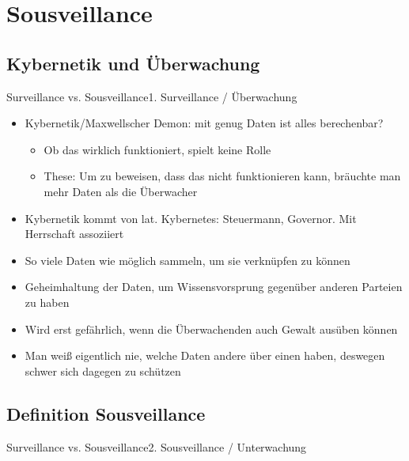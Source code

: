 \documentclass[10pt]{beamer}
\begin{document}
{%
\section{Sousveillance}
\subsection{Kybernetik und Überwachung}
\begin{frame}{Surveillance vs. Sousveillance}{1. Surveillance / Überwachung}

\begin{itemize}
  \item<1-> Kybernetik/Maxwellscher Demon: mit genug Daten ist alles berechenbar?
  \begin{itemize}
    \item<2-> Ob das wirklich funktioniert, spielt keine Rolle
    \item<2-> These: Um zu beweisen, dass das nicht funktionieren kann, bräuchte man mehr Daten als die Überwacher
  \end{itemize}
  \item<3-> Kybernetik kommt von lat. Kybernetes: Steuermann, Governor. Mit Herrschaft assoziiert
  \item<3-> So viele Daten wie möglich sammeln, um sie verknüpfen zu können
  \item<3-> Geheimhaltung der Daten, um Wissensvorsprung gegenüber anderen Parteien zu haben
  \item<4-> Wird erst gefährlich, wenn die Überwachenden auch Gewalt ausüben können
  \item<4-> Man weiß eigentlich nie, welche Daten andere über einen haben, deswegen schwer sich dagegen zu schützen
\end{itemize}

\end{frame}

\subsection{Definition Sousveillance}
\begin{frame}{Surveillance vs. Sousveillance}{2. Sousveillance / Unterwachung}


\end{frame}}
\end{document}
